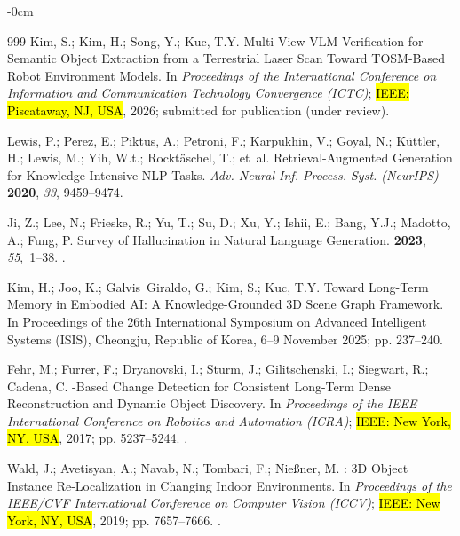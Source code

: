\documentclass[electronics,article,accept,pdftex,moreauthors]{Definitions/mdpi}
\begin{document}
\begin{adjustwidth}{-\extralength}{0cm}
\begin{thebibliography}{999}
Kim, S.; Kim, H.; Song, Y.; Kuc, T.Y. Multi-View VLM Verification for Semantic Object Extraction from a Terrestrial Laser Scan Toward TOSM-Based Robot Environment Models. In \emph{Proceedings of the International Conference on Information and Communication
  Technology Convergence (ICTC)}; \hl{IEEE:  Piscataway, NJ, USA}, {2026}; submitted for publication (under review).


Lewis, P.; Perez, E.; Piktus, A.; Petroni, F.; Karpukhin, V.; Goyal, N.;
  K{\"u}ttler, H.; Lewis, M.; Yih, W.t.; Rockt{\"a}schel, T.;  et~al.
\newblock Retrieval-Augmented Generation for Knowledge-Intensive {NLP} Tasks.
\newblock \textit{Adv. Neural Inf. Process. Syst. (NeurIPS)}  \textbf{2020}, \textit{33},  9459--9474.

Ji, Z.; Lee, N.; Frieske, R.; Yu, T.; Su, D.; Xu, Y.; Ishii, E.; Bang, Y.J.;
  Madotto, A.; Fung, P.
\newblock Survey of Hallucination in Natural Language Generation.
 {\bf 2023}, {\em 55},~1--38.
.

Kim, H.; Joo, K.; Galvis~Giraldo, G.; Kim, S.; Kuc, T.Y.
\newblock Toward Long-Term Memory in Embodied {AI}: A Knowledge-Grounded {3D}
  Scene Graph Framework.
\newblock In Proceedings of the 26th International Symposium on  Advanced Intelligent Systems
  (ISIS), Cheongju, Republic of Korea, 6--9 November  2025; pp. 237--240.

Fehr, M.; Furrer, F.; Dryanovski, I.; Sturm, J.; Gilitschenski, I.; Siegwart,
  R.; Cadena, C.
-Based Change Detection for Consistent Long-Term Dense
  Reconstruction and Dynamic Object Discovery.
\newblock In \textit{Proceedings of the IEEE International Conference on Robotics and Automation
  (ICRA)}; \hl{IEEE: New York, NY, USA},  2017; pp. 5237--5244.
.

Wald, J.; Avetisyan, A.; Navab, N.; Tombari, F.; Nie{\ss}ner, M.
: 3{D} Object Instance Re-Localization in Changing Indoor
  Environments.
\newblock In \textit{Proceedings of the IEEE/CVF International Conference on Computer Vision (ICCV)}; \hl{IEEE: New York, NY, USA},
  2019; pp. 7657--7666.
.


\end{thebibliography}
\end{adjustwidth}
\end{document}
